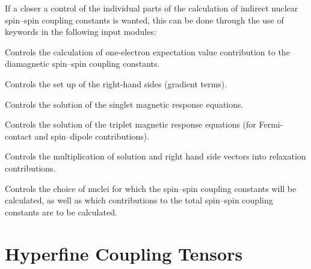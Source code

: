 If a closer a control of the individual parts of the calculation of
indirect nuclear spin--spin coupling constants is wanted, this can be
done through the use of keywords in the following input modules:

\begin{list}{}{\itemsep 0.10cm \parsep 0.0cm}
\item[\Sec{EXPECT}] Controls the calculation of one-electron
expectation value contribution to the diamagnetic spin--spin coupling
constants.
\item[\Sec{RHSIDE}] Controls the set up of the right-hand sides
(gradient terms).
\item[\Sec{LINRES}] Controls the solution of the singlet magnetic
response equations.
\item[\Sec{TRPRSP}] Controls the solution of the triplet magnetic
response equations (for Fermi-contact and spin--dipole contributions).
\item[\Sec{RELAX}] Controls the multiplication of solution and right hand
side vectors into relaxation contributions.
\item[\Sec{SPIN-S}] Controls the choice of nuclei for which the
spin--spin coupling constants will be calculated, as well as which
contributions to the total spin--spin coupling constants are to be
calculated.
\end{list}

\section{Hyperfine Coupling Tensors}

\begin{center}
\end{center}

